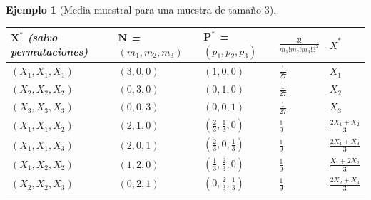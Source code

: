 \documentclass[
]{book}
\newcounter{none} %
\renewcommand{\mathbf}[1]{\symbf{#1}}
\theoremstyle{break}
\newtheorem{example}{Ejemplo}[chapter]
\theoremstyle{nonumberplain}
\begin{document}
\begin{example}[Media muestral para una muestra de tamaño 3]
{\def\LTcaptype{none} %
\begin{longtable}[]{@{}
  >{\raggedright\arraybackslash}p{}
  >{\raggedright\arraybackslash}p{}
  >{\raggedright\arraybackslash}p{}
  >{\raggedright\arraybackslash}p{}
  >{\raggedright\arraybackslash}p{}@{}}
\toprule\noalign{}
\begin{minipage}[b]{\linewidth}\raggedright
\(\mathbf{X}^{\ast}\) (salvo permutaciones)
\end{minipage} & \begin{minipage}[b]{\linewidth}\raggedright
\(\mathbf{N}\) = \(\left( m_1,m_2,m_3 \right)\)
\end{minipage} & \begin{minipage}[b]{\linewidth}\raggedright
\(\mathbf{P}^{\ast}\) = \(\left(p_1,p_2,p_3 \right)\)
\end{minipage} & \begin{minipage}[b]{\linewidth}\raggedright
\(\frac{3!}{m_1!m_2!m_3!3^{3}}\)
\end{minipage} & \begin{minipage}[b]{\linewidth}\raggedright
\(\bar{X}^{\ast}\)
\end{minipage} \\
\midrule\noalign{}
\endhead
\bottomrule\noalign{}
\endlastfoot
\(\left( X_1,X_1,X_1 \right)\) & \(\left( 3,0,0 \right)\) & \(\left(1,0,0 \right)\) & \(\frac{1}{27}\) & \(X_1\) \\
\(\left( X_2,X_2,X_2 \right)\) & \(\left( 0,3,0 \right)\) & \(\left(0,1,0 \right)\) & \(\frac{1}{27}\) & \(X_2\) \\
\(\left( X_3,X_3,X_3 \right)\) & \(\left( 0,0,3 \right)\) & \(\left(0,0,1 \right)\) & \(\frac{1}{27}\) & \(X_3\) \\
\(\left( X_1,X_1,X_2 \right)\) & \(\left( 2,1,0 \right)\) & \(\left( \frac{2}{3},\frac{1}{3},0 \right)\) & \(\frac{1}{9}\) & \(\frac{2X_1+X_2}{3}\) \\
\(\left( X_1,X_1,X_3 \right)\) & \(\left( 2,0,1 \right)\) & \(\left( \frac{2}{3},0,\frac{1}{3} \right)\) & \(\frac{1}{9}\) & \(\frac{2X_1+X_3}{3}\) \\
\(\left( X_1,X_2,X_2 \right)\) & \(\left( 1,2,0 \right)\) & \(\left( \frac{1}{3},\frac{2}{3},0 \right)\) & \(\frac{1}{9}\) & \(\frac{X_1+2X_2}{3}\) \\
\(\left( X_2,X_2,X_3 \right)\) & \(\left( 0,2,1 \right)\) & \(\left( 0,\frac{2}{3},\frac{1}{3} \right)\) & \(\frac{1}{9}\) & \(\frac{2X_2+X_3}{3}\) \\

\end{longtable}}
\end{example}
\end{document}
